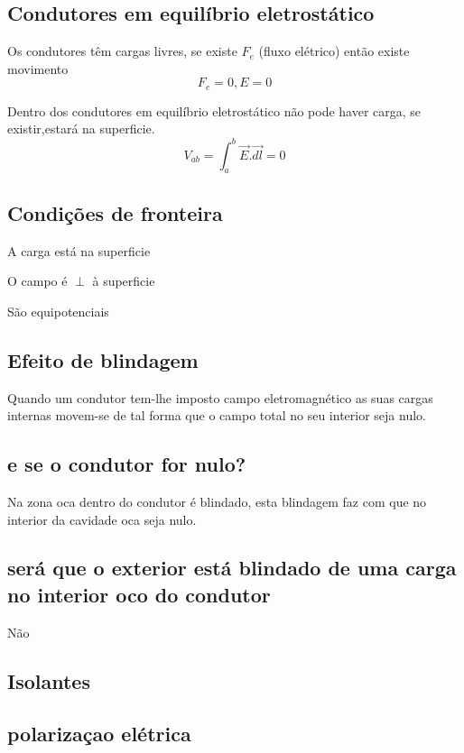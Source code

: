 \documentclass[a4paper]{article}
\begin{document}
\subsection{Condutores em equilíbrio eletrostático}
Os condutores têm cargas livres, se existe $F_e $ (fluxo elétrico) então existe movimento
\[F_e = 0, E = 0\]


Dentro dos condutores em equilíbrio eletrostático não pode haver carga, se existir,estará na superficie.
\[V_{ab} = \displaystyle\int_{a}^{b}\vec{E}.\vec{dl}=0\]
\subsection{Condições de fronteira}
A carga está na superficie

O campo é $\perp$ à superficie

São equipotenciais

\subsection{Efeito de blindagem}
Quando um condutor tem-lhe imposto campo eletromagnético as suas cargas internas movem-se de tal forma que o campo total no seu interior seja nulo.
\subsection{e se o condutor for nulo?}
Na zona oca dentro do condutor é blindado, esta blindagem faz com que no interior da cavidade oca seja nulo.
\subsection{será que o exterior está blindado de uma carga no interior oco do condutor}
Não

\subsection{Isolantes}
\subsection{polarizaçao elétrica}
\end{document}

